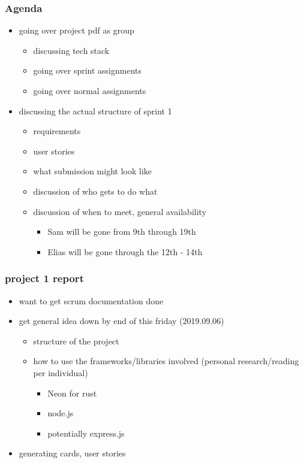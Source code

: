 \documentclass[11pt]{article}
\begin{document}
\subsubsection*{Agenda}
\label{sec:org6d282ba}
\begin{itemize}
\item going over project pdf as group
\begin{itemize}
\item discussing tech stack
\item going over sprint assignments
\item going over normal assignments
\end{itemize}
\item discussing the actual structure of sprint 1
\begin{itemize}
\item requirements
\item user stories
\item what submission might look like
\item discussion of who gets to do what
\item discussion of when to meet, general availability
\begin{itemize}
\item Sam will be gone from 9th through 19th
\item Elias will be gone through the 12th - 14th
\end{itemize}
\end{itemize}
\end{itemize}
\subsubsection*{project 1 report}
\label{sec:org788f085}
\begin{itemize}
\item want to get scrum documentation done
\item get general idea down by end of this friday (2019.09.06)
\begin{itemize}
\item structure of the project
\item how to use the frameworks/libraries involved (personal research/reading
per individual)
\begin{itemize}
\item Neon for rust
\item node.js
\item potentially express.js
\end{itemize}
\end{itemize}
\item generating cards, user stories
\end{itemize}
\end{document}
